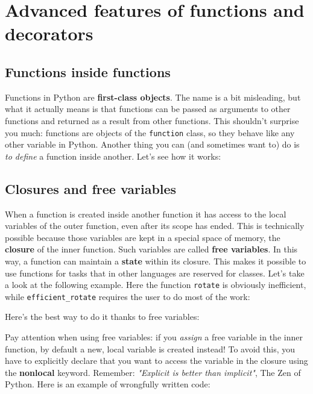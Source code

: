 \section{Advanced features of functions and decorators}

\subsection{Functions inside functions}
Functions in Python are \textbf{first-class objects}. The name is a bit misleading, but what it actually means is that functions can be passed as arguments to other functions and returned as a result from other functions. This shouldn't surprise you much: functions are objects of the \texttt{function} class, so they behave like any other variable in Python. Another thing you can (and sometimes want to) do is \textit{to define} a function inside another. Let's see how it works:



\subsection{Closures and free variables}
When a function is created inside another function it has access to the local variables of the outer function, even after its scope has ended. This is technically possible because those variables are kept in a special space of memory, the \textbf{closure} of the inner function. Such variables are called \textbf{free variables}. In this way, a function can maintain a \textbf{state} within its closure. This makes it possible to use functions for tasks that in other languages are reserved for classes. Let's take a look at the following example. Here the function \texttt{rotate} is obviously inefficient, while \texttt{efficient\_rotate} requires the user to do most of the work:



\bigskip

Here's the best way to do it thanks to free variables:

\bigskip



Pay attention when using free variables: if you \textit{assign} a free variable in the inner function, by default a new, local variable is created instead! To avoid this, you have to explicitly declare that you want to access the variable in the closure using the \textbf{nonlocal} keyword. Remember: \textit{"Explicit is better than implicit"}, The Zen of Python.
Here is an example of wrongfully written code: 

